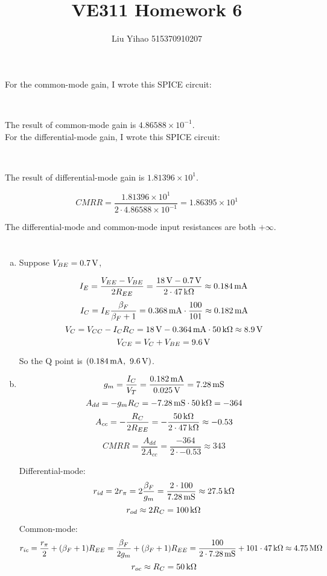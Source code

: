\documentclass{article}
\title{VE311 Homework 6}
\author{Liu Yihao 515370910207}
\date{}
\newcommand{\inputmintedindent}[2]{
\begin{minipage}{0.1\linewidth}\end{minipage}
\begin{minipage}{0.85\linewidth}\inputminted{#1}{#2}\end{minipage}\\[0.5em]
}
\newcommand{\unit}[1]{{\rm\,#1}}
\begin{document}
\maketitle

\section{}

For the common-mode gain, I wrote this SPICE circuit: \\

\inputmintedindent{v}{p1_1.cir}

The result of common-mode gain is $4.86588\times10^{-1}$. \\

For the differential-mode gain, I wrote this SPICE circuit: \\

\inputmintedindent{v}{p1_2.cir}

The result of differential-mode gain is $1.81396\times10^{1}$. 

$$CMRR = \frac{1.81396\times10^{1}}{2\cdot 4.86588\times10^{-1}} = 1.86395\times10^{1}$$

The differential-mode and common-mode input resistances are both $+\infty$.\\


\section{}

\begin{enumerate}[(a)]
\item
Suppose $V_{BE}=0.7\unit{V}$,

$$I_E=\frac{V_{EE}-V_{BE}}{2R_{EE}}=\frac{18\unit{V}-0.7\unit{V}}{2\cdot47\unit{k\Omega}}\approx0.184\unit{mA}$$
$$I_C=I_E\frac{\beta_F}{\beta_F+1}=0.368\unit{mA}\cdot\frac{100}{101}\approx0.182\unit{mA}$$
$$V_{C}=V_{CC}-I_CR_C=18\unit{V}-0.364\unit{mA}\cdot50\unit{k\Omega}\approx8.9\unit{V}$$
$$V_{CE}=V_{C}+V_{BE}=9.6\unit{V}$$

So the Q point is $(0.184\unit{mA},\ 9.6\unit{V})$.
\item
$$g_m=\frac{I_C}{V_T}=\frac{0.182\unit{mA}}{0.025\unit{V}}=7.28\unit{mS}$$
$$A_{dd}=-g_mR_C=-7.28\unit{mS}\cdot50\unit{k\Omega}=-364$$
$$A_{cc}=-\frac{R_C}{2R_{EE}}=-\frac{50\unit{k\Omega}}{2\cdot47\unit{k\Omega}}\approx-0.53$$
$$CMRR = \frac{A_{dd}}{2A_{cc}} = \frac{-364}{2\cdot -0.53} \approx 343$$

Differential-mode:
$$r_{id}=2r_{\pi}=2\frac{\beta_F}{g_m}=\frac{2\cdot100}{7.28\unit{mS}}\approx27.5\unit{k\Omega}$$
$$r_{od}\approx 2R_C=100\unit{k\Omega}$$

Common-mode:
$$r_{ic}=\frac{r_{\pi}}{2}+(\beta_F+1)R_{EE}=\frac{\beta_F}{2g_m}+(\beta_F+1)R_{EE}=\frac{100}{2\cdot7.28\unit{mS}}+101\cdot47\unit{k\Omega}\approx4.75\unit{M\Omega}$$
$$r_{oc}\approx R_C=50\unit{k\Omega}$$

\end{enumerate}
\end{document}
